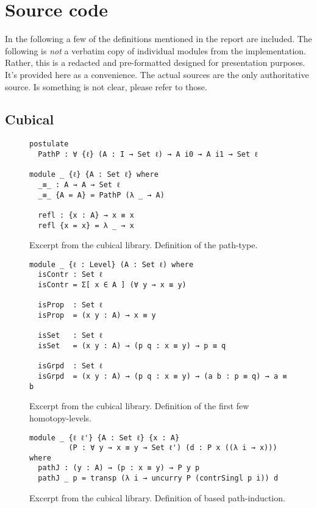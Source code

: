 \chapter{Source code}
\label{ch:app-sources}
In the following a few of the definitions mentioned in the report are included.
The following is \emph{not} a verbatim copy of individual modules from the
implementation. Rather, this is a redacted and pre-formatted designed for
presentation purposes. It's provided here as a convenience. The actual sources
are the only authoritative source. Is something is not clear, please refer to
those.
\clearpage
\section{Cubical}
\label{sec:app-cubical}
\begin{figure}[h]
\begin{Verbatim}
postulate
  PathP : ∀ {ℓ} (A : I → Set ℓ) → A i0 → A i1 → Set ℓ

module _ {ℓ} {A : Set ℓ} where
  _≡_ : A → A → Set ℓ
  _≡_ {A = A} = PathP (λ _ → A)

  refl : {x : A} → x ≡ x
  refl {x = x} = λ _ → x
\end{Verbatim}
\caption{Excerpt from the cubical library. Definition of the path-type.}
\end{figure}
%
\begin{figure}[h]
\begin{Verbatim}
module _ {ℓ : Level} (A : Set ℓ) where
  isContr : Set ℓ
  isContr = Σ[ x ∈ A ] (∀ y → x ≡ y)

  isProp  : Set ℓ
  isProp  = (x y : A) → x ≡ y

  isSet   : Set ℓ
  isSet   = (x y : A) → (p q : x ≡ y) → p ≡ q

  isGrpd  : Set ℓ
  isGrpd  = (x y : A) → (p q : x ≡ y) → (a b : p ≡ q) → a ≡ b
\end{Verbatim}
\caption{Excerpt from the cubical library. Definition of the first few
  homotopy-levels.}
\end{figure}
%
\begin{figure}[h]
\begin{Verbatim}
module _ {ℓ ℓ'} {A : Set ℓ} {x : A}
         (P : ∀ y → x ≡ y → Set ℓ') (d : P x ((λ i → x))) where
  pathJ : (y : A) → (p : x ≡ y) → P y p
  pathJ _ p = transp (λ i → uncurry P (contrSingl p i)) d
\end{Verbatim}
\clearpage
\caption{Excerpt from the cubical library. Definition of based path-induction.}
\end{figure}
